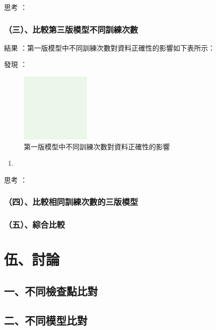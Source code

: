 \documentclass[8pt,a4paper,MingLiU,UTF8]{article}
\def\xeCJKembold{0.4}
\def\saveCJKnode{\dimen255\lastkern}
\def\restoreCJKnode{\kern-\dimen255\kern\dimen255}
\let\CJKoldsymbol\CJKsymbol
\let\CJKoldpunctsymbol\CJKpunctsymbol
\def\CJKfakeboldsymbol#1{%
	\special{pdf:literal direct 2 Tr \xeCJKembold\space w}%
	\CJKoldsymbol{#1}%
	\saveCJKnode
	\special{pdf:literal direct 0 Tr}%
	\restoreCJKnode}
\def\CJKfakeboldpunctsymbol#1{%
	\special{pdf:literal direct 2 Tr \xeCJKembold\space w}%
	\CJKoldpunctsymbol{#1}%
	\saveCJKnode
	\special{pdf:literal direct 0 Tr}%
	\restoreCJKnode}
\newcommand\CJKfakebold[1]{%
	\let\CJKsymbol\CJKfakeboldsymbol
	\let\CJKpunctsymbol\CJKfakeboldpunctsymbol
	#1%
	\let\CJKsymbol\CJKoldsymbol
	\let\CJKpunctsymbol\CJKoldpunctsymbol}
\begin{document}
\CJKfakebold{思考}：

\subsubsection{（三）、比較第三版模型不同訓練次數}
	\CJKfakebold{結果}：第一版模型中不同訓練次數對資料正確性的影響如下表所示：

\CJKfakebold{發現}：
\begin{figure}
	\centering
	\includegraphics[width=0.3\textwidth]{dummy}
	\caption{第一版模型中不同訓練次數對資料正確性的影響}
\end{figure}
\begin{enumerate}
	\item
\end{enumerate}

\CJKfakebold{思考}：

\subsubsection{（四）、比較相同訓練次數的三版模型}
\subsubsection{（五）、綜合比較}

	\section{伍、討論}

	\subsection{一、不同檢查點比對}
	\subsection{二、不同模型比對}
\end{document}

